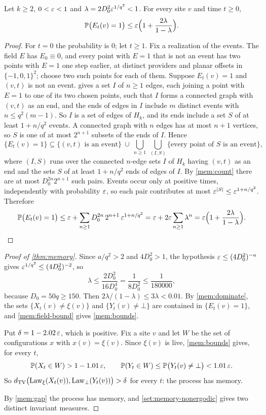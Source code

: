 \begin{lemma}\label{mem:field-bound}
Let $k\ge2$, $0<\varepsilon<1$ and $\lambda=2D_0^2\varepsilon^{1/q^2}<1$. For every site $v$ and time $t\ge0$,
\[
\mathbb{P}\bigl(E_t(v)=1\bigr)\le\varepsilon\Bigl(1+\frac{2\lambda}{1-\lambda}\Bigr).
\]
\end{lemma}

\begin{proof}
For $t=0$ the probability is $0$; let $t\ge1$. Fix a realization of the events. The field $E$ has $E_0\equiv0$, and every point with $E=1$ that is not an event has two points with $E=1$ one step earlier, at distinct providers and planar offsets in $\{-1,0,1\}^2$; choose two such points for each of them. Suppose $E_t(v)=1$ and $(v,t)$ is not an event.  gives a set $I$ of $n\ge1$ edges, each joining a point with $E=1$ to one of its two chosen points, such that $I$ forms a connected graph with $(v,t)$ as an end, and the ends of edges in $I$ include $m$ distinct events with $n\le q^2(m-1)$. So $I$ is a set of edges of $H_k$, and its ends include a set $S$ of at least $1+n/q^2$ events. A connected graph with $n$ edges has at most $n+1$ vertices, so $S$ is one of at most $2^{n+1}$ subsets of the ends of $I$. Hence
\[
\{E_t(v)=1\}\subseteq\{(v,t)\text{ is an event}\}\ \cup\ \bigcup_{n\ge1}\ \bigcup_{(I,S)}\{\text{every point of }S\text{ is an event}\},
\]
where $(I,S)$ runs over the connected $n$-edge sets $I$ of $H_k$ having $(v,t)$ as an end and the sets $S$ of at least $1+n/q^2$ ends of edges of $I$. By \cref{mem:count} there are at most $D_0^{2n}2^{n+1}$ such pairs. Events occur only at positive times, independently with probability $\varepsilon$, so each pair contributes at most $\varepsilon^{|S|}\le\varepsilon^{1+n/q^2}$. Therefore
\[
\mathbb{P}\bigl(E_t(v)=1\bigr)\le\varepsilon+\sum_{n\ge1}D_0^{2n}\,2^{n+1}\,\varepsilon^{1+n/q^2}=\varepsilon+2\varepsilon\sum_{n\ge1}\lambda^n=\varepsilon\Bigl(1+\frac{2\lambda}{1-\lambda}\Bigr).
\qedhere
\]
\end{proof}

\begin{proof}[Proof of \cref{thm:memory}]
Since $a/q^2>2$ and $4D_0^2>1$, the hypothesis $\varepsilon\le(4D_0^2)^{-a}$ gives $\varepsilon^{1/q^2}\le(4D_0^2)^{-2}$, so
\[
\lambda\le\frac{2D_0^2}{16D_0^4}=\frac1{8D_0^2}\le\frac1{180000},
\]
because $D_0=50q\ge150$. Then $2\lambda/(1-\lambda)\le3\lambda<0.01$. By \cref{mem:dominate}, the sets $\{X_t(v)\ne\xi(v)\}$ and $\{Y_t(v)\ne\bot\}$ are contained in $\{E_t(v)=1\}$, and \cref{mem:field-bound} gives \eqref{mem:bounds}.

Put $\delta=1-2.02\,\varepsilon$, which is positive. Fix a site $v$ and let $W$ be the set of configurations $x$ with $x(v)=\xi(v)$. Since $\xi(v)$ is live, \eqref{mem:bounds} gives, for every $t$,
\begin{equation}\label{mem:gap}
\mathbb{P}(X_t\in W)>1-1.01\,\varepsilon,\qquad
\mathbb{P}(Y_t\in W)\le\mathbb{P}\bigl(Y_t(v)\ne\bot\bigr)<1.01\,\varepsilon .
\end{equation}
So $d_{\mathrm{TV}}\bigl(\mathrm{Law}_\xi(X_t(v)),\mathrm{Law}_\bot(Y_t(v))\bigr)>\delta$ for every $t$: the process has memory.

By \eqref{mem:gap} the process has memory, and \cref{set:memory-nonergodic} gives two distinct invariant measures.
\end{proof}

